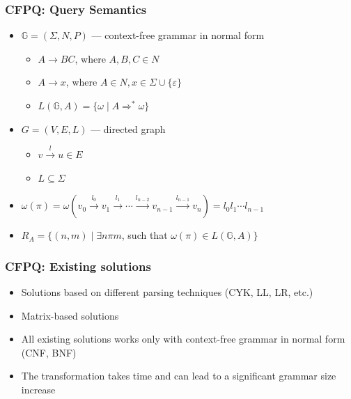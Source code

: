 \documentclass[xcolor=table]{beamer}
\begin{document}
  \begin{frame}[fragile]
    \frametitle{CFPQ: Query Semantics}
    \begin{itemize}
      \item $\mathbb{G} = (\Sigma, N, P)$ --- context-free grammar in normal form
      \begin{itemize}
        \item $A \rightarrow B C$, where $A, B, C \in N$
        \item $A \rightarrow x$, where $A \in N, x \in \Sigma \cup \{\varepsilon\}$
        \item $L(\mathbb{G},A) = \{ \omega \mid A \Rightarrow^* \omega \}$
      \end{itemize}
      \pause
      \item $G = (V,E,L)$ --- directed graph
        \begin{itemize}
          \item $v \xrightarrow{l} u \in E$
          \item $L \subseteq \Sigma$
        \end{itemize}
        \pause
      \item $\omega(\pi) = \omega(v_0 \xrightarrow{l_0} v_1 \xrightarrow{l_1} \cdots \xrightarrow{l_{n-2}} v_{n-1} \xrightarrow{l_{n-1}} v_n) = l_0 l_1 \cdots l_{n-1}$
      \pause
      \item $R_A = \{ (n, m) \mid \exists n \pi m$, such that $\omega(\pi) \in L(\mathbb{G},A)\}$
    \end{itemize}
  \end{frame}

  \begin{frame}[fragile] \frametitle{CFPQ: Existing solutions}
    	\begin{itemize}
    		\item Solutions based on different parsing techniques (CYK, LL, LR, etc.)
    		\pause
    		\item Matrix-based solutions
    		\pause
    		\item All existing solutions works only with context-free grammar in normal form (CNF, BNF)
    		\pause
    		\item The transformation takes time and can lead to a significant grammar size increase
    		
    	\end{itemize}
  \end{frame}
\end{document}
